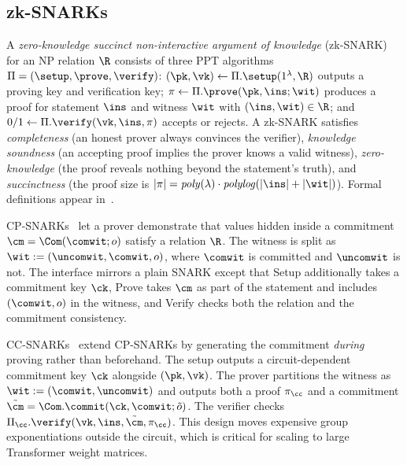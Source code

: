 \subsection{zk-SNARKs}
A \textit{zero-knowledge succinct non-interactive argument of knowledge} (zk-SNARK) for an NP relation $\R$ consists of three PPT algorithms $\Pi=(\setup,\prove,\verify)$: $(\pk,\vk)\gets\Pi.\setup(1^\lambda,\R)$ outputs a proving key and verification key; $\pi\gets\Pi.\prove(\pk,\ins;\wit)$ produces a proof for statement $\ins$ and witness $\wit$ with $(\ins,\wit)\in\R$; and $0/1\gets\Pi.\verify(\vk,\ins,\pi)$ accepts or rejects. A zk-SNARK satisfies \emph{completeness} (an honest prover always convinces the verifier), \emph{knowledge soundness} (an accepting proof implies the prover knows a valid witness), \emph{zero-knowledge} (the proof reveals nothing beyond the statement's truth), and \emph{succinctness} (the proof size is $|\pi|=\mathit{poly}(\lambda)\cdot\mathit{polylog}(|\ins|+|\wit|)$). Formal definitions appear in~\cite{Groth16}.

CP-SNARKs~\cite{Legosnark,Lunar} let a prover demonstrate that values hidden inside a commitment $\cm=\Com(\comwit;o)$ satisfy a relation $\R$. The witness is split as $\wit:=(\uncomwit,\comwit,o)$, where $\comwit$ is committed and $\uncomwit$ is not. The interface mirrors a plain SNARK except that Setup additionally takes a commitment key $\ck$, Prove takes $\cm$ as part of the statement and includes $(\comwit,o)$ in the witness, and Verify checks both the relation and the commitment consistency.

CC-SNARKs~\cite{Legosnark,Vectis} extend CP-SNARKs by generating the commitment \emph{during} proving rather than beforehand. The setup outputs a circuit-dependent commitment key $\ck$ alongside $(\pk,\vk)$. The prover partitions the witness as $\wit:=(\comwit,\uncomwit)$ and outputs both a proof $\pi_\cc$ and a commitment $\tilde{\cm}=\Com.\commit(\ck,\comwit;\tilde{o})$. The verifier checks $\Pi_\cc.\verify(\vk,\ins,\tilde{\cm},\pi_\cc)$. This design moves expensive group exponentiations outside the circuit, which is critical for scaling to large Transformer weight matrices.

